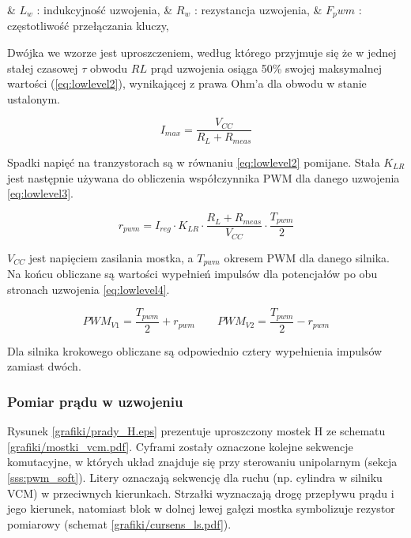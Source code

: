 \begin{easylist}
	& $ L_w $ : indukcyjność uzwojenia,
	& $ R_w $ : rezystancja uzwojenia,
	& $ F_pwm $ : częstotliwość przełączania kluczy,
	\\
\end{easylist} 

Dwójka we wzorze jest uproszczeniem, według którego przyjmuje się że w jednej stałej czasowej $ \tau $ obwodu $ RL $  prąd uzwojenia osiąga 50\% swojej maksymalnej wartości (\ref{eq:lowlevel2}), wynikającej z prawa Ohm'a dla obwodu w stanie ustalonym.

\begin{equation} \label{eq:lowlevel2}
	I_{max} = \frac{V_{CC}}{R_L + R_{meas}}
\end{equation}

Spadki napięć na tranzystorach są w równaniu \ref{eq:lowlevel2} pomijane. Stała $ K_{LR} $ jest następnie używana do obliczenia współczynnika PWM dla danego uzwojenia \ref{eq:lowlevel3}.

\begin{equation} \label{eq:lowlevel3}
	r_{pwm} = I_{reg} \cdot K_{LR} \cdot \frac{R_L + R_{meas}}{V_{CC}} \cdot \frac{T_{pwm}}{2}
\end{equation}

$ V_{CC} $ jest napięciem zasilania mostka, a $ T_{pwm} $ okresem PWM dla danego silnika. Na końcu obliczane są wartości wypełnień impulsów dla potencjałów po obu stronach uzwojenia \ref{eq:lowlevel4}.

\begin{equation} \label{eq:lowlevel4}
	PWM_{V1} = \frac{T_{pwm}}{2} + r_{pwm} 	\qquad 	PWM_{V2} = \frac{T_{pwm}}{2} - r_{pwm}
\end{equation}

Dla silnika krokowego obliczane są odpowiednio cztery wypełnienia impulsów zamiast dwóch.

\subsubsection{Pomiar prądu w uzwojeniu}

Rysunek \ref{grafiki/prady_H.eps} prezentuje uproszczony mostek H ze schematu \ref{grafiki/mostki_vcm.pdf}. Cyframi zostały oznaczone kolejne sekwencje komutacyjne, w których układ znajduje się przy sterowaniu unipolarnym (sekcja \ref{sss:pwm_soft}). Litery oznaczają sekwencję dla ruchu (np. cylindra w silniku VCM) w przeciwnych kierunkach. Strzałki wyznaczają drogę przepływu prądu i jego kierunek, natomiast blok w dolnej lewej gałęzi mostka symbolizuje rezystor pomiarowy (schemat \ref{grafiki/cursens_ls.pdf}). 

